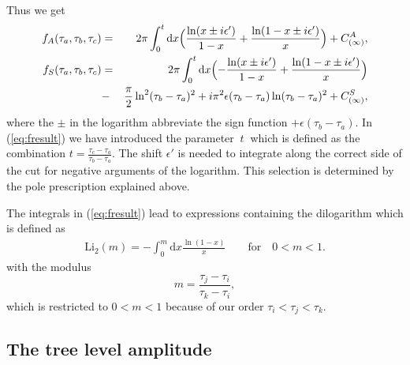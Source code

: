 \documentclass[a4paper,12pt]{article}
\newcommand {\ud} {\mathrm{d}}
\newcommand {\Li} {\mathrm{Li}_2}
\begin{document}
Thus we get
\begin{eqnarray}
  \label{eq:fresult}
  f_A(\tau_a,\tau_b,\tau_c) &=& 
  2\pi \int _0^t \ud x \Bigl( \frac{\ln(x \pm i \epsilon')}{1-x}
  + \frac{\ln(1-x \pm i \epsilon')}{x}
  \Bigr) + C^A_{(\infty)} , \nonumber\\
  f_S(\tau_a,\tau_b,\tau_c) &=&
  2\pi \int _0^t \ud x \Bigl( - \frac{\ln(x \pm i \epsilon')}{1-x}
  + \frac{\ln(1-x \pm i \epsilon')}{x} \Bigr) \\
  &-& \frac {\pi}{2} \ln^2(\tau_b - \tau_a)^2
   +  i \pi^2 \epsilon(\tau_b-\tau_a) \ln(\tau_b-\tau_a)^2 +
  C^S_{(\infty)} , \nonumber
\end{eqnarray}
where the $\pm$ in the logarithm abbreviate the
sign function $+\epsilon(\tau_b-\tau_a)$.
In (\ref{eq:fresult}) we have introduced the parameter $~t~$ which is 
defined as the combination $t = \frac {\tau_c-\tau_a}{\tau_b-\tau_a}$.
The shift $\epsilon'$ is needed to integrate along the correct side of
the cut for negative arguments of the logarithm. This selection is
determined by the pole prescription explained above.

The integrals in (\ref{eq:fresult}) lead to expressions containing
the dilogarithm which is defined as
\begin{eqnarray}
  \label{eq:dilog}
  \Li(m) = - \int _0^m \ud x \frac{\ln(1-x)}{x}
  \quad\quad \mathrm{for} \quad 0 < m < 1 .
\end{eqnarray}
with the modulus
\begin{equation}
  \label{eq:modulus}
  m = \frac {\tau_j-\tau_i}{\tau_k-\tau_i} ,
\end{equation}
which is restricted to $0 < m < 1$ because of our order
$\tau_i < \tau_j < \tau_k$.


\subsection{The tree level amplitude}
\end{document}
